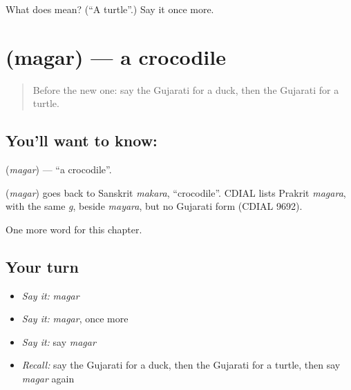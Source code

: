 \begin{tcolorbox}[breakable,colback=teal!4,colframe=teal!35!black,title={Before you move on}]
What does  mean? (\textquotedblleft{}A turtle\textquotedblright{}.) Say it once more.
\end{tcolorbox}
\section[\texorpdfstring{\gu{મગર} (magar)}{મગર (magar)}]{ (magar) — a crocodile}

\label{lesson:GU-C123-magar}



\begin{quote}
Before the new one: say the Gujarati for a duck, then the Gujarati for a turtle.
\end{quote}

\subsection*{You'll want to know: }
\textbf{} (\emph{magar}) — \textquotedblleft{}a crocodile\textquotedblright{}.

\begin{cousinweb}
\textbf{} (\emph{magar}) goes back to Sanskrit \emph{makara}, \textquotedblleft{}crocodile\textquotedblright{}. CDIAL lists Prakrit \emph{magara}, with the same \emph{g}, beside \emph{mayara}, but no Gujarati form (CDIAL 9692).
\end{cousinweb}

\begin{grammarlens}[title={What you've built}]
One more word for this chapter.
\end{grammarlens}

\subsection*{Your turn}
\begin{itemize}
\raggedright
  \item \emph{Say it:} \emph{magar}
  \item \emph{Say it:} \emph{magar}, once more
  \item \emph{Say it:} say \emph{magar}
  \item \emph{Recall:} say the Gujarati for a duck, then the Gujarati for a turtle, then say \emph{magar} again
\end{itemize}

